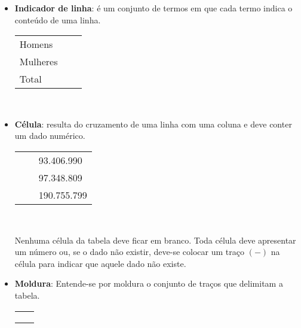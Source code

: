 \documentclass[11pt,fleqn]{book} %
\begin{document}
\begin{example}
\begin{itemize}
	\item {\bf Indicador de linha}: é um conjunto de termos em que cada termo indica o conteúdo de uma linha.
	\begin{eBox}
	\centering
	\begin{tabular}{l l l}
	\midrule
	Homens & \hspace{2cm} & \\
	Mulheres & & \\
	\hline
	Total & & \\
	\bottomrule
	\end{tabular} \\
	\end{eBox}
	
	\hspace{0.5cm}		
	
	\item {\bf Célula}: resulta do cruzamento de uma linha com uma coluna e deve conter um dado numérico.
	\begin{eBox}
	\centering
	\begin{tabular}{l l l}
	\midrule
	& \hspace{2cm} & 93.406.990 \\
	& & 97.348.809 \\
	\hline
	& & 190.755.799 \\
	\bottomrule
	\end{tabular} \\
	\end{eBox}
	
	Nenhuma célula da tabela deve ficar em branco. Toda célula deve apresentar um número ou, se o dado não existir, deve-se colocar um traço $( - )$ na célula para indicar que aquele dado não existe.\\

	
	\item {\bf Moldura}: Entende-se por moldura o conjunto de traços que delimitam a tabela.
	\begin{eBox}
	\centering	
	\begin{tabular}{l l}
	\toprule
	\hspace{2cm} & \hspace{2cm} \\
	\midrule
	 &  \\
	 &  \\
	 \hline
	 &  \\
	\bottomrule
	\end{tabular} \\
	\end{eBox}
		

\end{itemize}
\end{example}
\end{document}
